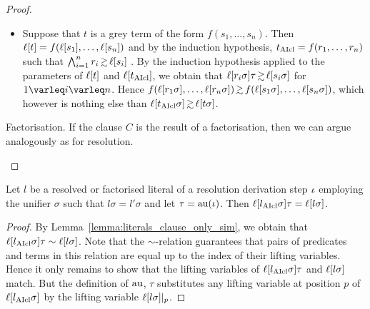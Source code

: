 \documentclass[,%
	draft=false,%
	numbers=noendperiod
	11pt,
	a4paper,
	oneside,%
	openany,
]{memoir}
\begin{document}
{\begin{proof}
\begin{description}
\begin{itemize}
					\item
						Suppose that $t$ is a grey term of the form $f(s_1, \dots, s_n)$.
						Then $\ell[t] = f(\ell[s_1], \dots, \ell[s_n])$ and by the induction hypothesis, $t_{\operatorname{AIcl}} = f(r_1, \dots, r_n)$ such that
						$\bigwedge_{i=1}^n r_i \simgeq \lifboth{s_i}$ .
						By the induction hypothesis applied to the parameters of $\ell[t]$ and $\ell[t_{\operatorname{AIcl}}]$, we obtain that  $\lifboth{r_i\sigma}\tau \simgeq \lifboth{s_i\sigma}$ for $1\nolinebreak \varleq\nolinebreak i\nolinebreak \varleq\nolinebreak n$.
						Hence $  f(\lifboth{r_1\sigma}, \dots, \lifboth{r_n\sigma}) \simgeq f(\lifboth{s_1\sigma}, \dots, \lifboth{s_n\sigma})$,
						which however is nothing else than
						$\lifboth{t\cl\sigma} \simgeq \lifboth{t\sigma} $.

				\end{itemize}

			\item{Factorisation.}
				If the clause $C$ is the result of a factorisation, then we can argue analogously as for resolution.
				\qedhere
		\end{description}

	\end{proof}

}

\begin{lemma}
	\label{lemma:resolved_literal_like_lifted_literal}
	Let $l$ be a resolved or factorised literal of a resolution derivation step $\iota$ employing the unifier $\sigma$ such that $l\sigma = l'\sigma$ and let $\tau =\nolinebreak \aiu(\inference)$.
	Then $\ell[l_{\operatorname{AIcl}}\sigma]\tau = \ell[l\sigma]$.
\end{lemma}
\begin{proof}
	By Lemma~\ref{lemma:literals_clause_only_sim}, we obtain that
	$\ell[l_{\operatorname{AIcl}}\sigma]\tau \sim \ell[l\sigma]$.
	Note that the \mbox{$\sim$-relation} guarantees that pairs of predicates and terms in this relation are equal up to the index of their lifting variables.
	Hence it only remains to show that the lifting variables of $\ell[l_{\operatorname{AIcl}}\sigma]\tau$ and $\ell[l\sigma]$ match.
	But the definition of $\operatorname{au}$, $\tau$ substitutes any lifting variable at position $p$ of $\ell[l_{\operatorname{AIcl}}\sigma]$ by the lifting variable $\ell[l\sigma]|_{p}$.
\end{proof}
\end{document}
